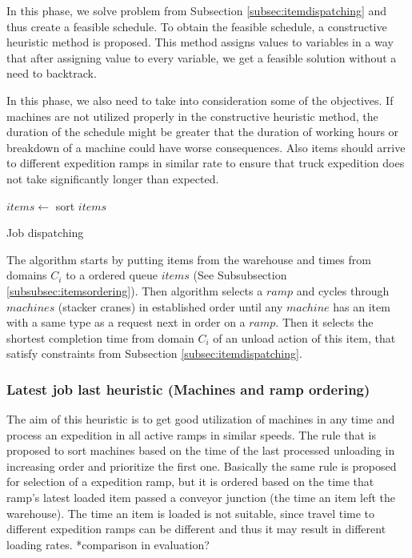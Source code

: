 \documentclass{ctuthesis}
\begin{document}
In this phase, we solve problem from Subsection \ref{subsec:itemdispatching} and thus create a feasible schedule.
To obtain the feasible schedule, a constructive heuristic method is proposed. This method assigns values to variables in a way that after assigning value to every variable, we get a feasible solution without a need to backtrack.

In this phase, we also need to take into consideration some of the objectives. If machines are not utilized properly in the constructive heuristic method, the duration of the schedule might be greater that the duration of working hours or breakdown of a machine could have worse consequences. Also items should arrive to different expedition ramps in similar rate to ensure that truck expedition does not take significantly longer than expected.

\begin{algorithm}[H]
\SetAlgoLined
{}
  $items \leftarrow$ sort $items$\;
\caption{Job dispatching}
\end{algorithm}

The algorithm starts by putting items from the warehouse and times from domains $C_i$ to a ordered queue $items$ (See Subsubsection \ref{subsubsec:itemsordering}). Then algorithm selects a $ramp$ and cycles through $machines$ (stacker cranes) in established order until any $machine$ has an item with a same type as a request next in order on a $ramp$. Then it selects the shortest completion time from domain $C_i$ of an unload action of this item, that satisfy constraints from Subsection \ref{subsec:itemdispatching}. 


\subsubsection{Latest job last heuristic (Machines and ramp ordering)}

The aim of this heuristic is to get good utilization of machines in any time and process an expedition in all active ramps in similar speeds. The rule that is proposed to sort machines based on the time of the last processed unloading in increasing order and prioritize the first one. 
Basically the same rule is proposed for selection of a expedition ramp, but it is ordered based on the time that ramp's latest loaded item passed a conveyor junction (the time an item left the warehouse). The time an item is loaded is not suitable, since travel time to different expedition ramps can be different and thus it may result in different loading rates. *comparison in evaluation?
\end{document}
